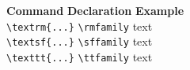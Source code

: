 \documentclass{article}
\newcommand{\head}[1]{\textbf{#1}}
\begin{document}
 
\begin{tabbing}
  \= \head{Command} \= \head{Declaration} \= \head{Example}\\
  \> \verb|\textrm{...}| \> \verb|\rmfamily| \> \rmfamily text\\
  \> \verb|\textsf{...}| \> \verb|\sffamily| \> \sffamily text\\
  \> \verb|\texttt{...}| \> \verb|\ttfamily| \> \ttfamily text
\end{tabbing}
\end{document}
